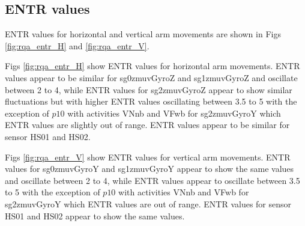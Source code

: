 \newpage
\subsection{ENTR values}
ENTR values for horizontal and vertical arm movements are shown 
in Figs \ref{fig:rqa_entr_H} and \ref{fig:rqa_entr_V}.

Figs \ref{fig:rqa_entr_H} show ENTR values for horizontal arm movements.
ENTR values appear to be similar for sg0zmuvGyroZ and sg1zmuvGyroZ 
and oscillate between 2 to 4, while ENTR values for sg2zmuvGyroZ appear 
to show similar fluctuations but with higher ENTR values oscillating 
between 3.5 to 5  with the exception of $p10$ with activities VNnb and VFwb 
for sg2zmuvGyroY which ENTR values are slightly out of range.
ENTR values appear to be similar for sensor HS01 and HS02.

Figs \ref{fig:rqa_entr_V} show ENTR values for vertical arm movements.
ENTR values for sg0zmuvGyroY and sg1zmuvGyroY appear to show the same
values and oscillate between 2 to 4, while ENTR values appear to oscillate
between 3.5 to 5 with the exception of $p10$ with activities VNnb and VFwb 
for sg2zmuvGyroY which ENTR values are out of range.
ENTR values for sensor HS01 and HS02 appear to show the same values. 




